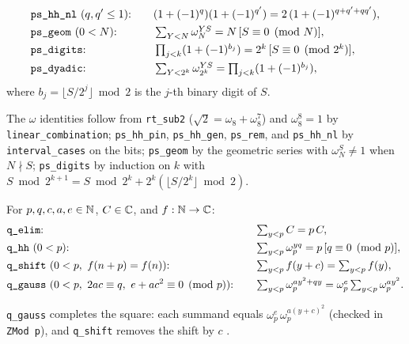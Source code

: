 \begin{theorem}
\begin{alignat*}{2}
&\text{\textnormal{\texttt{ps\_\allowbreak{}hh\_\allowbreak{}nl}} }(q,q'\le1)\text{:}\quad && (1+(-1)^q)(1+(-1)^{q'}) = 2\,(1+(-1)^{q+q'+qq'}),\\
&\text{\textnormal{\texttt{ps\_\allowbreak{}geom}} }(0<N)\text{:}\quad && \textstyle\sum_{Y<N}\omega_N^{YS} = N\,[S\equiv0\pmod N],\\
&\text{\textnormal{\texttt{ps\_\allowbreak{}digits}}:}\quad && \textstyle\prod_{j<k}(1+(-1)^{b_j}) = 2^k\,[S\equiv 0\pmod{2^k}],\\
&\text{\textnormal{\texttt{ps\_\allowbreak{}dyadic}}:}\quad && \textstyle\sum_{Y<2^k}\omega_{2^k}^{YS} = \prod_{j<k}(1+(-1)^{b_j}),
\end{alignat*}
where $b_j = \lfloor S/2^j\rfloor\bmod 2$ is the $j$-th binary digit of $S$.
\end{theorem}
\noindent The $\omega$ identities follow from \textnormal{\texttt{rt\_\allowbreak{}sub2}} ($\sqrt2=\omega_8+\omega_8^7$) and
$\omega_8^8=1$ by \textnormal{\texttt{linear\_\allowbreak{}combination}}; \textnormal{\texttt{ps\_\allowbreak{}hh\_\allowbreak{}pin}}, \textnormal{\texttt{ps\_\allowbreak{}hh\_\allowbreak{}gen}}, \textnormal{\texttt{ps\_\allowbreak{}rem}}, and
\textnormal{\texttt{ps\_\allowbreak{}hh\_\allowbreak{}nl}} by \textnormal{\texttt{interval\_\allowbreak{}cases}} on the bits; \textnormal{\texttt{ps\_\allowbreak{}geom}} by the geometric series with
$\omega_N^S\ne1$ when $N\nmid S$; \textnormal{\texttt{ps\_\allowbreak{}digits}} by induction on $k$ with
$S\bmod 2^{k+1} = S\bmod 2^k + 2^k(\lfloor S/2^k\rfloor\bmod2)$.

\begin{theorem}\label{thm:lean-pathsum-q}
For $p,q,c,a,e\in\mathbb{N}$, $C\in\mathbb{C}$, and $f:\mathbb{N}\to\mathbb{C}$:
\begin{alignat*}{2}
&\text{\textnormal{\texttt{q\_\allowbreak{}elim}}:}\quad && \textstyle\sum_{y<p} C = p\,C,\\
&\text{\textnormal{\texttt{q\_\allowbreak{}hh}} }(0<p)\text{:}\quad && \textstyle\sum_{y<p}\omega_p^{yq} = p\,[q\equiv0\pmod p],\\
&\text{\textnormal{\texttt{q\_\allowbreak{}shift}} }(0<p,\ f(n+p)=f(n))\text{:}\quad && \textstyle\sum_{y<p} f(y+c)=\sum_{y<p} f(y),\\
&\text{\textnormal{\texttt{q\_\allowbreak{}gauss}}}\ (0<p,\ 2ac\equiv q,\ e+ac^2\equiv0 \pmod p)\text{:}\quad &&
 \textstyle\sum_{y<p}\omega_p^{ay^2+qy} = \omega_p^{e}\sum_{y<p}\omega_p^{ay^2}.
\end{alignat*}
\end{theorem}
\noindent \textnormal{\texttt{q\_\allowbreak{}gauss}} completes the square: each summand equals
$\omega_p^e\,\omega_p^{a(y+c)^2}$ (checked in \textnormal{\texttt{ZMod p}}), and \textnormal{\texttt{q\_\allowbreak{}shift}} removes the shift
by $c$ \cite{berndt1998gauss}.

